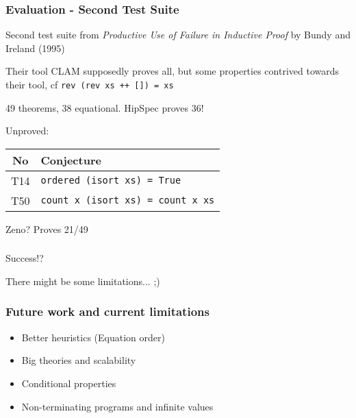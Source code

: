 \documentclass[serif,professionalfont]{beamer}
\newcommand\dn[0]{\vspace{\baselineskip}}
\newcommand\hs[1]{\texttt{#1}}
\begin{document}
\begin{frame}[fragile]
  \frametitle{Evaluation - Second Test Suite}

  Second test suite from
      \emph{Productive Use of Failure in Inductive Proof}
      \hspace{1em} by Bundy and Ireland (1995)

  \dn

  Their tool CLAM supposedly proves all, but some properties contrived
  towards their tool, cf \hs{rev (rev xs ++ []) = xs}

  \dn

  49 theorems, 38 equational. \pause HipSpec proves 36!

  \pause
  \dn

  Unproved:
  \begin{center}
  \begin{tabular}{>{\small}c >{\small}l}
  No  & Conjecture \\
  \hline
  T14 & \verb!ordered (isort xs) = True! \\
  T50 & \verb!count x (isort xs) = count x xs! \\
  \end{tabular}
  \end{center}

  \dn

  Zeno? \pause Proves 21/49

\end{frame}

\begin{frame}
  \frametitle{}
    \begin{center}
    {\color{Purpleee} \Huge Success!\pause?}

    \vspace{\baselineskip}

    There might be some limitations... ;)
    \end{center}
\end{frame}

\begin{frame}[fragile]
  \frametitle{Future work and current limitations}

  \begin{itemize}
    \item Better heuristics (Equation order)
    \item Big theories and scalability
    \item Conditional properties
    \item Non-terminating programs and infinite values
  \end{itemize}

\end{frame}
\end{document}
